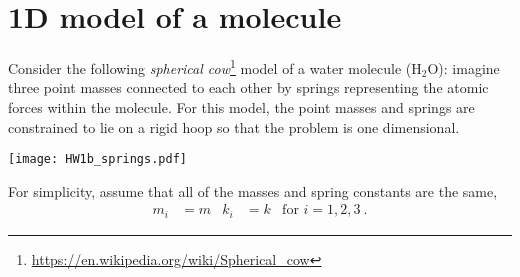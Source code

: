 \documentclass[12pt]{article}
\numberwithin{equation}{section}    %
\begin{document}
\section{1D model of a molecule}


Consider the following \emph{spherical cow}\footnote{\url{https://en.wikipedia.org/wiki/Spherical_cow}} model of a water molecule (H$_2$O): imagine three point masses connected to each other by springs representing the atomic forces within the molecule. For this model, the point masses and springs are constrained to lie on a rigid hoop so that the problem is one dimensional. 

\begin{center}
	\texttt{[image: HW1b\_springs.pdf]}
\end{center}

For simplicity, assume that all of the masses and spring constants are the same,
\begin{align}
	m_i &= m & k_i &= k 
	&
	\text{for } i=1,2,3 
	\ .
\end{align}
\end{document}
